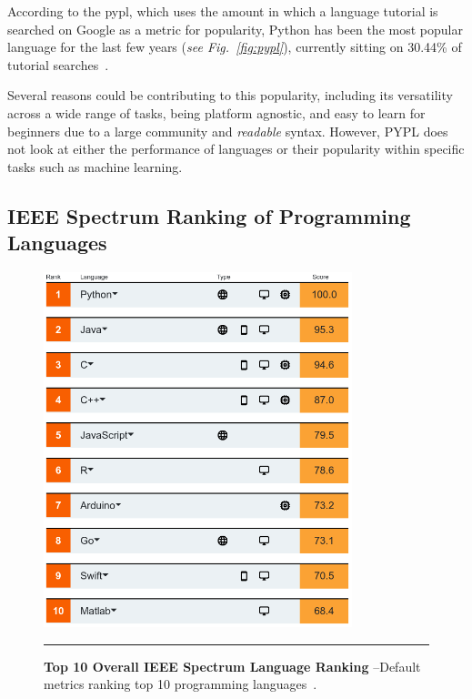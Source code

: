 According to the \Gls{pypl}, which uses the amount in which 
a language tutorial is searched on Google as a metric for popularity, Python has been the most popular language
for the last few years (\textit{see Fig.~\ref{fig:pypl}}), currently sitting on 30.44\% of tutorial searches~\citep{pypl}.

Several reasons could be contributing to this popularity, including its versatility across a wide range
of tasks, being platform agnostic, and easy to learn for beginners due to a large community and \textit{readable} syntax. However,
PYPL does not look at either the performance of languages or their popularity within specific tasks such as machine learning.
\subsection{IEEE Spectrum Ranking of Programming Languages}

\begin{figure}[H]
	\centering
        \includegraphics[width=0.8\textwidth]{media/literature/ieee-spectrum-all.png}
        \rule{35em}{0.5pt}
        \caption[Top 10 Overall IEEE Spectrum Language Ranking]{\textbf{Top 10 Overall IEEE Spectrum Language Ranking} --Default metrics ranking top 10 programming languages~\citep{ieee-spectrum}.}\label{fig:ieee-all}
\end{figure}


